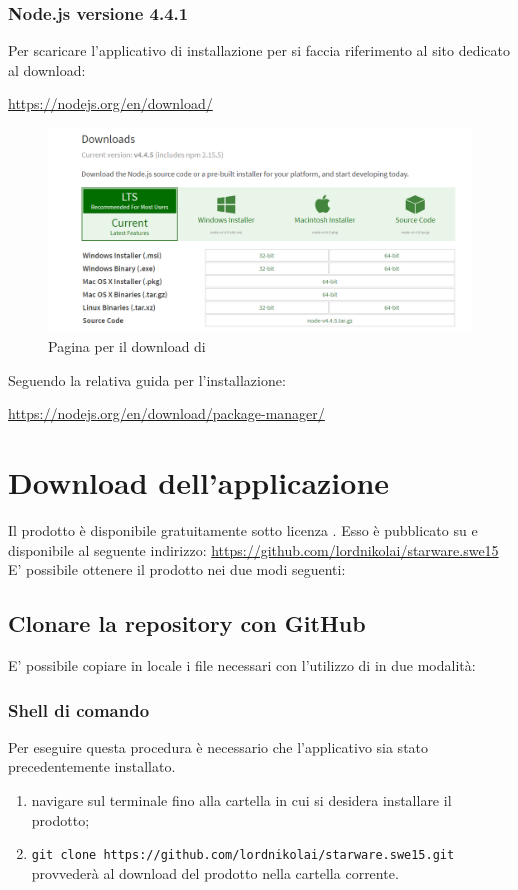 \documentclass[12pt,a4paper]{article}
\begin{document}
	\subsubsection{Node.js versione 4.4.1}
		Per scaricare l'applicativo di installazione per  si faccia riferimento al sito dedicato al download:
		\begin{center}
			 \url{https://nodejs.org/en/download/} 
		\end{center}
			\begin{figure}[H]	
				\centering
				\includegraphics[width=1.0\linewidth]{../img/manualeInstallazione/nodeDownloadCenter.png}
				\caption{Pagina per il download di }
				\label{Pagina per il download di node.js}
			\end{figure}
		Seguendo la relativa guida per l'installazione:
		\begin{center} \url{https://nodejs.org/en/download/package-manager/}
		\end{center}
	
	\newpage
	\section{Download dell'applicazione}\label{download}
	Il prodotto è disponibile gratuitamente sotto  licenza \licenza. Esso è pubblicato su  e disponibile al seguente indirizzo: \url{https://github.com/lordnikolai/starware.swe15}
	E' possibile ottenere il prodotto nei due modi seguenti:
	\subsection{Clonare la repository con GitHub}
	E' possibile copiare in locale i file necessari con l'utilizzo di  in due modalità:
	
	\subsubsection{Shell di comando} 
	Per eseguire questa procedura è necessario che l'applicativo  sia stato precedentemente installato.
	\begin{enumerate}
		\item navigare sul terminale fino alla cartella in cui si desidera installare il prodotto;
		\item \texttt{git clone https://github.com/lordnikolai/starware.swe15.git} provvederà al download del prodotto nella cartella corrente. 
	\end{enumerate}
	
\end{document}
